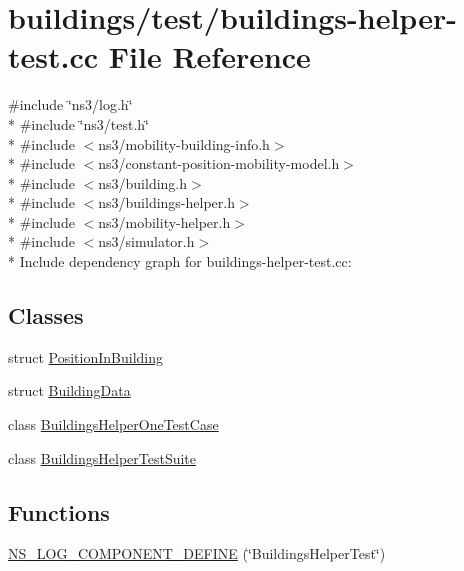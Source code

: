 \hypertarget{buildings-helper-test_8cc}{}\section{buildings/test/buildings-\/helper-\/test.cc File Reference}
\label{buildings-helper-test_8cc}
{\ttfamily \#include \char`\"{}ns3/log.\+h\char`\"{}}\\*
{\ttfamily \#include \char`\"{}ns3/test.\+h\char`\"{}}\\*
{\ttfamily \#include $<$ns3/mobility-\/building-\/info.\+h$>$}\\*
{\ttfamily \#include $<$ns3/constant-\/position-\/mobility-\/model.\+h$>$}\\*
{\ttfamily \#include $<$ns3/building.\+h$>$}\\*
{\ttfamily \#include $<$ns3/buildings-\/helper.\+h$>$}\\*
{\ttfamily \#include $<$ns3/mobility-\/helper.\+h$>$}\\*
{\ttfamily \#include $<$ns3/simulator.\+h$>$}\\*
Include dependency graph for buildings-\/helper-\/test.cc\+:
\subsection*{Classes}
\begin{DoxyCompactItemize}
\item 
struct \hyperlink{structPositionInBuilding}{Position\+In\+Building}
\item 
struct \hyperlink{structBuildingData}{Building\+Data}
\item 
class \hyperlink{classBuildingsHelperOneTestCase}{Buildings\+Helper\+One\+Test\+Case}
\item 
class \hyperlink{classBuildingsHelperTestSuite}{Buildings\+Helper\+Test\+Suite}
\end{DoxyCompactItemize}
\subsection*{Functions}
\begin{DoxyCompactItemize}
\item 
\hyperlink{buildings-helper-test_8cc_a948d33dd5c07ce20477023345f1551f4}{N\+S\+\_\+\+L\+O\+G\+\_\+\+C\+O\+M\+P\+O\+N\+E\+N\+T\+\_\+\+D\+E\+F\+I\+NE} (\char`\"{}Buildings\+Helper\+Test\char`\"{})
\end{DoxyCompactItemize}
